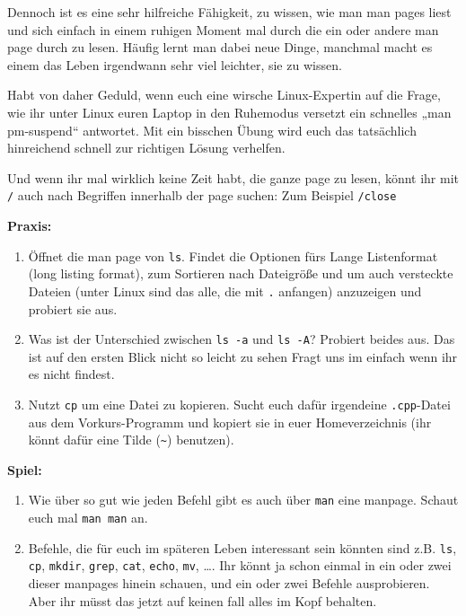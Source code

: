 Dennoch ist es eine sehr hilfreiche Fähigkeit, zu wissen, wie man man pages
liest und sich einfach in einem ruhigen Moment mal durch die ein oder andere
man page durch zu lesen. Häufig lernt man dabei neue Dinge, manchmal macht es
einem das Leben irgendwann sehr viel leichter, sie zu wissen.

Habt von daher Geduld, wenn euch eine wirsche Linux-Expertin auf die Frage, wie
ihr unter Linux euren Laptop in den Ruhemodus versetzt ein schnelles „man
pm-suspend“ antwortet. Mit ein bisschen Übung wird euch das tatsächlich
hinreichend schnell zur richtigen Lösung verhelfen.

Und wenn ihr mal wirklich keine Zeit habt, die ganze page zu lesen, könnt ihr mit \texttt{/} auch nach Begriffen innerhalb der page suchen: Zum Beispiel \texttt{/close}

\textbf{Praxis:}
\begin{enumerate}[resume]
    \item Öffnet die man page von \texttt{ls}. Findet die Optionen fürs Lange
				Listenformat (long listing format), zum Sortieren nach Dateigröße
				und um auch versteckte Dateien (unter Linux sind das alle, die mit
				\texttt{.} anfangen) anzuzeigen und probiert sie aus.
    \item Was ist der Unterschied zwischen \texttt{ls -a} und \texttt{ls -A}?
        Probiert beides aus. Das ist auf den ersten Blick nicht so leicht zu sehen
				Fragt uns im einfach wenn ihr es nicht findest.
    \item Nutzt \texttt{cp} um eine Datei zu kopieren. Sucht euch dafür
        irgendeine \texttt{.cpp}-Datei aus dem Vorkurs-Programm und kopiert sie
        in euer Homeverzeichnis (ihr könnt dafür eine Tilde (\texttt{\~})
        benutzen).
\end{enumerate}

\textbf{Spiel:}
\begin{enumerate}
    \item Wie über so gut wie jeden Befehl gibt es auch über \texttt{man} eine
        manpage. Schaut euch mal \texttt{man man} an.
    \item Befehle, die für euch im späteren Leben interessant sein könnten sind
        z.B. \texttt{ls}, \texttt{cp}, \texttt{mkdir}, \texttt{grep}, \texttt{cat},
        \texttt{echo}, \texttt{mv}, \dots. Ihr könnt ja schon einmal in ein
        oder zwei dieser manpages hinein schauen, und ein oder zwei Befehle
        ausprobieren. Aber ihr müsst das jetzt auf keinen fall alles im Kopf
				behalten.
\end{enumerate}
